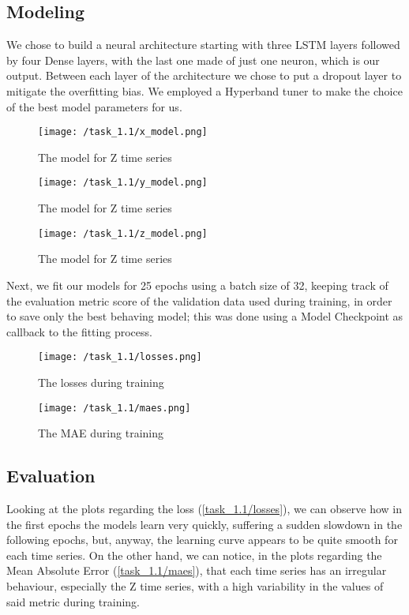 \documentclass[12pt,a4paper,leqno]{article}
\begin{document}
	\subsection{Modeling}
	We chose to build a neural architecture starting with three LSTM layers followed by four Dense layers, with the last one made of just one neuron, which is our output. Between each layer of the architecture we chose to put a dropout layer to mitigate the overfitting bias. We employed a Hyperband tuner to make the choice of the best model parameters for us.
	\begin{figure}
		\centering
		\texttt{[image: /task\_1.1/x\_model.png]}
		\caption{The model for Z time series}
		\label{task_1.1/x_model}
	\end{figure}
	\begin{figure}
		\centering
		\texttt{[image: /task\_1.1/y\_model.png]}
		\caption{The model for Z time series}
		\label{task_1.1/y_model}
	\end{figure}
	\begin{figure}
		\centering
		\texttt{[image: /task\_1.1/z\_model.png]}
		\caption{The model for Z time series}
		\label{task_1.1/z_model}
	\end{figure}
	Next, we fit our models for 25 epochs using a batch size of 32, keeping track of the evaluation metric score of the validation data used during training, in order to save only the best behaving model; this was done using a Model Checkpoint as callback to the fitting process.
	\begin{figure}[h]
		\centering
		\texttt{[image: /task\_1.1/losses.png]}
		\caption{The losses during training}
		\label{task_1.1/losses}
	\end{figure}
	\begin{figure}[h]
		\centering
		\texttt{[image: /task\_1.1/maes.png]}
		\caption{The MAE during training}
		\label{task_1.1/maes}
	\end{figure}
	
	\subsection{Evaluation}
	Looking at the plots regarding the loss (\autoref{task_1.1/losses}), we can observe how in the first epochs the models learn very quickly, suffering a sudden slowdown in the following epochs, but, anyway, the learning curve appears to be quite smooth for each time series. On the other hand, we can notice, in the plots regarding the Mean Absolute Error (\autoref{task_1.1/maes}), that each time series has an irregular behaviour, especially the Z time series, with a high variability in the values of said metric during training.
	
\end{document}
